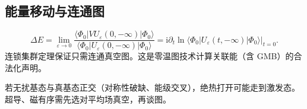 \subsection{能量移动与连通图}

\begin{equation}
  \Delta E
  =\lim_{\varepsilon\to0}
  \frac{
  \langle\Phi_0|V U_\varepsilon(0,-\infty)|\Phi_0\rangle
  }{
  \langle\Phi_0|U_\varepsilon(0,-\infty)|\Phi_0\rangle
  }
  =\mathrm{i}
  \partial_t
  \ln\langle\Phi_0|U_\varepsilon(t,-\infty)|\Phi_0\rangle\Big|_{t=0}.
\end{equation}
连锁集群定理保证只需连通真空图。这是零温图技术计算关联能（含 GMB）的合法化声明。

\begin{note}
若无扰基态与真基态正交（对称性破缺、能级交叉），绝热打开可能走到激发态。超导、磁有序需先选对平均场真空，再谈图。
\end{note}
